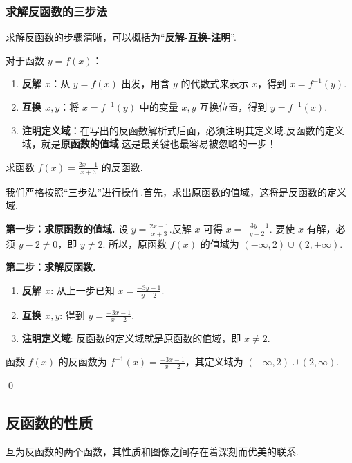 \subsubsection*{求解反函数的三步法}
求解反函数的步骤清晰，可以概括为“\textbf{反解-互换-注明}”.
\begin{note}
	对于函数 $y=f(x)$：
	\begin{enumerate}
		\item \textbf{反解 $x$}：从 $y=f(x)$ 出发，用含 $y$ 的代数式来表示 $x$，得到 $x=f^{-1}(y)$.
		\item \textbf{互换 $x, y$}：将 $x=f^{-1}(y)$ 中的变量 $x, y$ 互换位置，得到 $y=f^{-1}(x)$.
		\item \textbf{注明定义域}：在写出的反函数解析式后面，必须注明其定义域.反函数的定义域，就是\textbf{原函数的值域}.这是最关键也最容易被忽略的一步！
	\end{enumerate}
\end{note}

\begin{exercise}
	求函数 $f(x) = \frac{2x-1}{x+3}$ 的反函数.
\end{exercise}
\begin{solution}
	\textcolor{green!50!black}{我们严格按照“三步法”进行操作.首先，求出原函数的值域，这将是反函数的定义域.}
	
	\textbf{第一步：求原函数的值域.}
	设 $y = \frac{2x-1}{x+3}$.反解 $x$ 可得 $x = \frac{-3y-1}{y-2}$.
	要使 $x$ 有解，必须 $y-2 \neq 0$，即 $y \neq 2$.
	所以，原函数 $f(x)$ 的值域为 $(-\infty, 2) \cup (2, +\infty)$.
	
	\textbf{第二步：求解反函数.}
	\begin{enumerate}
		\item \textbf{反解 $x$}: 从上一步已知 $x = \frac{-3y-1}{y-2}$.
		\item \textbf{互换 $x, y$}: 得到 $y = \frac{-3x-1}{x-2}$.
		\item \textbf{注明定义域}: 反函数的定义域就是原函数的值域，即 $x \neq 2$.
	\end{enumerate}
	
	函数 $f(x)$ 的反函数为 $f^{-1}(x) = \frac{-3x-1}{x-2}$，其定义域为 $(-\infty, 2) \cup (2, \infty)$.
\end{solution}
\qed

\subsection{反函数的性质}
互为反函数的两个函数，其性质和图像之间存在着深刻而优美的联系.

